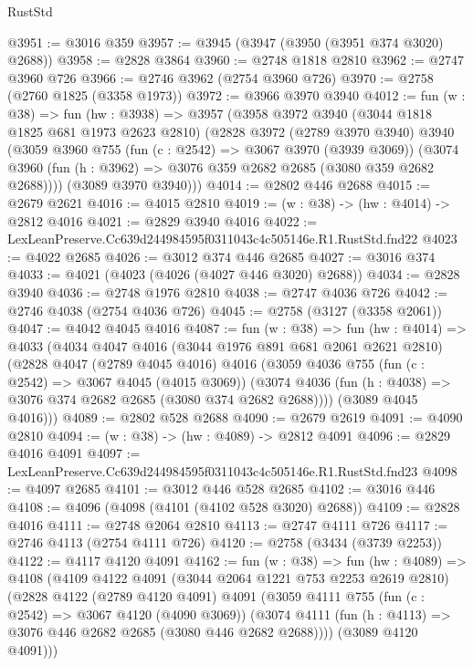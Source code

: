 \begin{lexlean}{RustStd}
\begin{coremodule}
@3951 := @3016 @359
@3957 := @3945 (@3947 (@3950 (@3951 @374 @3020) @2688))
@3958 := @2828 @3864
@3960 := @2748 @1818 @2810
@3962 := @2747 @3960 @726
@3966 := @2746 @3962 (@2754 @3960 @726)
@3970 := @2758 (@2760 @1825 (@3358 @1973))
@3972 := @3966 @3970 @3940
@4012 := fun (w : @38) =>
  fun (hw : @3938) =>
  @3957
    (@3958
      @3972
      @3940
      (@3044 @1818 @1825 @681 @1973 @2623 @2810)
      (@2828
        @3972
        (@2789 @3970 @3940)
        @3940
        (@3059
          @3960
          @755
          (fun (c : @2542) => @3067 @3970 (@3939 @3069))
          (@3074 @3960 (fun (h : @3962) => @3076 @359 @2682 @2685 (@3080 @359 @2682 @2688))))
        (@3089 @3970 @3940)))
@4014 := @2802 @446 @2688
@4015 := @2679 @2621
@4016 := @4015 @2810
@4019 := (w : @38) -> (hw : @4014) -> @2812 @4016
@4021 := @2829 @3940 @4016
@4022 := LexLeanPreserve.Cc639d244984595f0311043c4c505146e.R1.RustStd.fnd22
@4023 := @4022 @2685
@4026 := @3012 @374 @446 @2685
@4027 := @3016 @374
@4033 := @4021 (@4023 (@4026 (@4027 @446 @3020) @2688))
@4034 := @2828 @3940
@4036 := @2748 @1976 @2810
@4038 := @2747 @4036 @726
@4042 := @2746 @4038 (@2754 @4036 @726)
@4045 := @2758 (@3127 (@3358 @2061))
@4047 := @4042 @4045 @4016
@4087 := fun (w : @38) =>
  fun (hw : @4014) =>
  @4033
    (@4034
      @4047
      @4016
      (@3044 @1976 @891 @681 @2061 @2621 @2810)
      (@2828
        @4047
        (@2789 @4045 @4016)
        @4016
        (@3059
          @4036
          @755
          (fun (c : @2542) => @3067 @4045 (@4015 @3069))
          (@3074 @4036 (fun (h : @4038) => @3076 @374 @2682 @2685 (@3080 @374 @2682 @2688))))
        (@3089 @4045 @4016)))
@4089 := @2802 @528 @2688
@4090 := @2679 @2619
@4091 := @4090 @2810
@4094 := (w : @38) -> (hw : @4089) -> @2812 @4091
@4096 := @2829 @4016 @4091
@4097 := LexLeanPreserve.Cc639d244984595f0311043c4c505146e.R1.RustStd.fnd23
@4098 := @4097 @2685
@4101 := @3012 @446 @528 @2685
@4102 := @3016 @446
@4108 := @4096 (@4098 (@4101 (@4102 @528 @3020) @2688))
@4109 := @2828 @4016
@4111 := @2748 @2064 @2810
@4113 := @2747 @4111 @726
@4117 := @2746 @4113 (@2754 @4111 @726)
@4120 := @2758 (@3434 (@3739 @2253))
@4122 := @4117 @4120 @4091
@4162 := fun (w : @38) =>
  fun (hw : @4089) =>
  @4108
    (@4109
      @4122
      @4091
      (@3044 @2064 @1221 @753 @2253 @2619 @2810)
      (@2828
        @4122
        (@2789 @4120 @4091)
        @4091
        (@3059
          @4111
          @755
          (fun (c : @2542) => @3067 @4120 (@4090 @3069))
          (@3074 @4111 (fun (h : @4113) => @3076 @446 @2682 @2685 (@3080 @446 @2682 @2688))))
        (@3089 @4120 @4091)))

\end{coremodule}
\end{lexlean}
